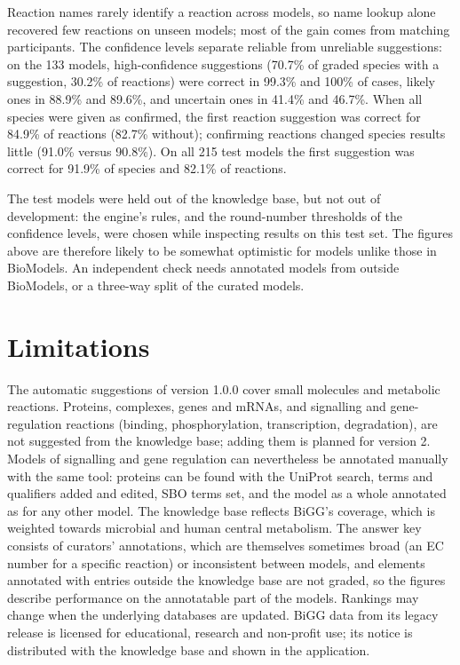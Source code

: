\documentclass[10pt]{article}
\begin{document}
Reaction names rarely identify a reaction across models, so name lookup alone recovered few reactions
on unseen models; most of the gain comes from matching participants. The confidence levels separate
reliable from unreliable suggestions: on the 133 models, high-confidence suggestions (70.7\% of graded
species with a suggestion, 30.2\% of reactions) were correct in 99.3\% and 100\% of cases, likely ones in
88.9\% and 89.6\%, and uncertain ones in 41.4\% and 46.7\%. When all species were given as confirmed, the
first reaction suggestion was correct for 84.9\% of reactions (82.7\% without); confirming reactions changed
species results little (91.0\% versus 90.8\%). On all 215 test models the first suggestion was correct for
91.9\% of species and 82.1\% of reactions.

The test models were held out of the knowledge base, but not out of development: the engine's rules, and
the round-number thresholds of the confidence levels, were chosen while inspecting results on this test
set. The figures above are therefore likely to be somewhat optimistic for models unlike those in BioModels.
An independent check needs annotated models from outside BioModels, or a three-way split of the curated
models.

\section{Limitations}
The automatic suggestions of version 1.0.0 cover small molecules and metabolic reactions. Proteins,
complexes, genes and mRNAs, and signalling and gene-regulation reactions (binding, phosphorylation,
transcription, degradation), are not suggested from the knowledge base; adding them is planned for version 2.
Models of signalling and gene regulation can nevertheless be annotated manually with the same tool: proteins
can be found with the UniProt search, terms and qualifiers added and edited, SBO terms set, and the model as
a whole annotated as for any other model. The knowledge base reflects
BiGG's coverage, which is weighted towards microbial and human central metabolism. The answer key consists
of curators' annotations, which are themselves sometimes broad (an EC number for a specific reaction) or
inconsistent between models, and elements annotated with entries outside the knowledge base are not graded,
so the figures describe performance on the annotatable part of the models. Rankings may change when the
underlying databases are updated. BiGG data from its legacy release is licensed for educational, research
and non-profit use; its notice is distributed with the knowledge base and shown in the application.
\end{document}
